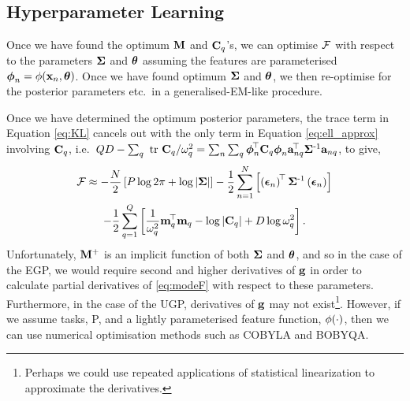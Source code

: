 \subsection{Hyperparameter Learning}
Once we have found the optimum $\mathbf{M}$ and $\mathbf{C}_q$'s, we can optimise
$\mathcal{F}$ with respect to the parameters $\mathbf{\Sigma}$ and $\boldsymbol\theta$ assuming the
features are parameterised $\boldsymbol\phi_n = \phi\!\left({{\mathbf{x}_n, \boldsymbol\theta}}\right)$. Once we
have found optimum $\mathbf{\Sigma}$ and $\boldsymbol\theta$, we then re-optimise for the
posterior parameters etc.\ in a generalised-EM-like procedure.

Once we have determined the optimum posterior parameters, the trace term in
Equation \eqref{eq:KL} cancels out with the only term in Equation \eqref{eq:ell_approx} 
involving $\mathbf{C}_q$, i.e.\ $QD -
\sum_q\mbox{ \rm tr }{\ensuremath{\mathbf{C}}_q}/\omega^2_q = 
\sum_n \sum_q \boldsymbol\phi_n^{\!\top}\mathbf{C}_q  \boldsymbol\phi_n\mathbf{a}_{nq}^{\!\top}\mathbf{\Sigma}^{\text{-}1} \mathbf{a}_{nq}$,
to give,
\begin{multline}
    \mathcal{F} \approx 
        - \frac{N}{2}\left[{P\log{2\pi} + \log\left|{\mathbf{\Sigma}}\right|}\right]
    - \frac{1}{2} \sum^N_{n=1} \left[{
        \left({\boldsymbol{ \epsilon }_n}\right)^{\!\top}
        \mathbf{\Sigma}^{\text{-}1}
        \left({\boldsymbol{ \epsilon }_n}\right)}\right] \\
        -\frac{1}{2} \sum^{Q}_{q=1} \left[{
        \frac{1}{\omega^2_q} \mathbf{m}_q^{\!\top}\mathbf{m}_q
        - \log\left|{\mathbf{C}_q}\right| + D \log \omega^2_q}\right].
    \label{eq:modeF}
\end{multline}
Unfortunately, $\mathbf{M}^{+}$ is an implicit function of both $\mathbf{\Sigma}$ and
$\boldsymbol\theta$, and so in the case of the EGP, we would require second and higher
derivatives of $\mathbf{g}$ in order to calculate partial derivatives of
\eqref{eq:modeF} with respect to these parameters. Furthermore, in the case
of the UGP, derivatives of $\mathbf{g}$ may not exist\footnote{Perhaps we could
    use repeated applications of statistical linearization to approximate the
    derivatives.}. However, if we assume  tasks, P, and a lightly
parameterised feature function, $\phi\!\left({{\cdot}}\right)$, then we can use numerical 
optimisation methods such as COBYLA and BOBYQA.

